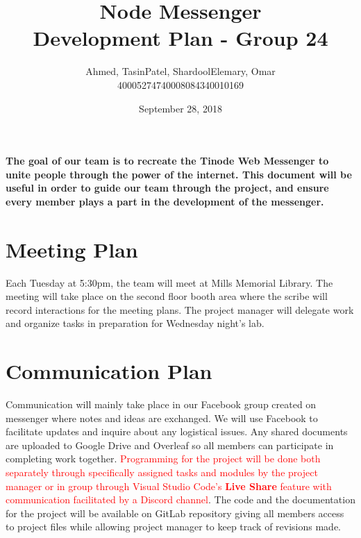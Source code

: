 \documentclass{article}
\title{\Huge\textbf{Node Messenger}\\
		\huge{Development Plan - Group 24}}
\author{Ahmed, Tasin\hspace{1cm}Patel, Shardool\hspace{1cm}Elemary, Omar \\
		400052747\hspace{2cm}400080843\hspace{2cm}40010169}
\date{September 28, 2018}
\begin{document}
\maketitle

\paragraph{The goal of our team is to recreate the Tinode Web Messenger to unite people through the power of the internet. This document will be useful in order to guide our team through the project, and ensure every member plays a part in the development of the messenger.}

\section{Meeting Plan}
Each Tuesday at 5:30pm, the team will meet at Mills Memorial Library. The meeting will take place on the second floor booth area where the scribe will record interactions for the meeting plans. The project manager will delegate work and organize tasks in preparation for Wednesday night's lab.

\section{Communication Plan}
Communication will mainly take place in our Facebook group created on messenger where notes and ideas are exchanged. We will use Facebook to facilitate updates and inquire about any logistical issues. Any shared documents are uploaded to Google Drive and Overleaf so all members can participate in completing work together. \textcolor{red}{Programming for the project will be done both separately through specifically assigned tasks and modules by the project manager or in group through Visual Studio Code's \textbf{Live Share} feature with communication facilitated by a Discord channel}. The code and the documentation for the project will be available on GitLab repository giving all members access to project files while allowing project manager to keep track of revisions made. 
\end{document}
